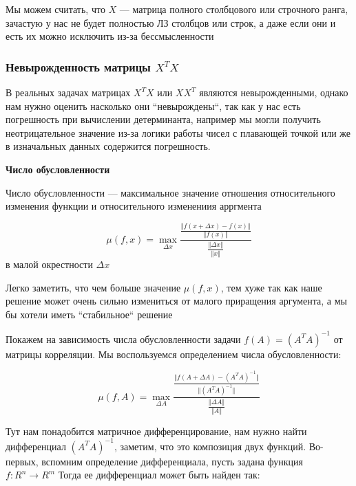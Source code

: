 \documentclass{article}
\begin{document}
    Мы можем считать, что $X$ --- матрица полного столбцового или строчного ранга, зачастую у нас не будет полностью ЛЗ столбцов или строк, а
    даже если они и есть их можно исключить из-за бессмысленности

    \subsubsection{Невырожденность матрицы $X^{T} X$}

    В реальных задачах матрицах $X^{T} X$ или $X X^{T}$ являются невырожденными, однако нам нужно оценить насколько они
    ``невырождены``, так как у нас есть погрешность при вычислении детерминанта, например мы могли получить неотрицательное значение
    из-за логики работы чисел с плавающей точкой или же в изначальных данных содержится погрешность.

    \quad

    \textbf{Число обусловленности}

    \quad


    Число обусловленности --- максимальное значение отношения относительного изменения функции и относительного изменениия арргмента

    \begin{equation}
        \mu(f, x) = \max_{\Delta x} \frac{ \frac{\Vert f(x + \Delta x) - f(x) \Vert}{\Vert f(x) \Vert}  }{ \frac{\Vert \Delta x \Vert}{\Vert x \Vert } }
    \end{equation}
    в малой окрестности $\Delta x$

    Легко заметить, что чем больше значение $\mu(f, x)$, тем хуже так как наше решение может очень сильно измениться от малого приращения аргумента, а мы бы хотели
    иметь ``стабильное`` решение

    \quad

    Покажем на зависимость числа обусловленности задачи $f(A) = (A^T A)^{-1}$ от матрицы корреляции.
    Мы воспользуемся определением числа обусловленности:

    \begin{equation}
        \mu(f, A) = \max_{\Delta A} \frac{ \frac{\Vert f(A + \Delta A) - (A^T A)^{-1}  \Vert }{\Vert (A^T A)^{-1} \Vert} }{ \frac{\Vert \Delta A \Vert}{\Vert A \Vert} }
    \end{equation}

    Тут нам понадобится матричное дифференцирование, нам нужно найти дифференциал $(A^T A)^{-1}$, заметим, что это композиция двух функций.
    Во-первых, вспомним определение дифференциала, пусть задана функция $f: R^{n} \rightarrow R^{m}$
    Тогда ее дифференциал может быть найден так:
\end{document}
